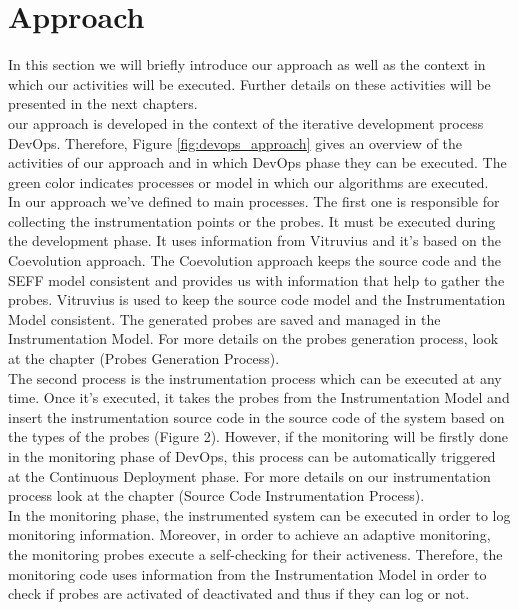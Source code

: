 \section{Approach}
\label{sec:approach}
In this section we will briefly introduce our approach as well as the context in which our activities will be executed. Further details on these activities will be presented in the next chapters.\\

our approach is developed in the context of the iterative development process DevOps. Therefore, Figure \ref{fig:devops_approach} gives an overview of the activities of our approach and in which DevOps phase they can be executed. The green color indicates processes or model in which our algorithms are executed. \\

In our approach we've defined to main processes. The first one is responsible for collecting the instrumentation points or the probes. It must be executed during the development phase. It uses information from Vitruvius and it's based on the Coevolution approach. The Coevolution approach keeps the source code and the SEFF model consistent and provides us with information that help to gather the probes. Vitruvius is used to keep the source code model and the Instrumentation Model consistent. The generated probes are saved and managed in the Instrumentation Model. For more details on the probes generation process, look at the chapter (Probes Generation Process).\\

The second process is the instrumentation process which can be executed at any time. Once it's executed, it takes the probes from the Instrumentation Model and insert the instrumentation source code in the source code of the system based on the types of the probes (Figure 2). However, if the monitoring will be firstly done in the monitoring phase of DevOps, this process can be automatically triggered at the Continuous Deployment phase. For more details on our instrumentation process look at the chapter (Source Code Instrumentation Process).\\

In the monitoring phase, the instrumented system can be executed in order to log monitoring information. Moreover, in order to achieve an adaptive monitoring, the monitoring probes execute a self-checking for their activeness. Therefore, the monitoring code uses information from the Instrumentation Model in order to check if probes are activated of deactivated and thus if they can log or not. \\


